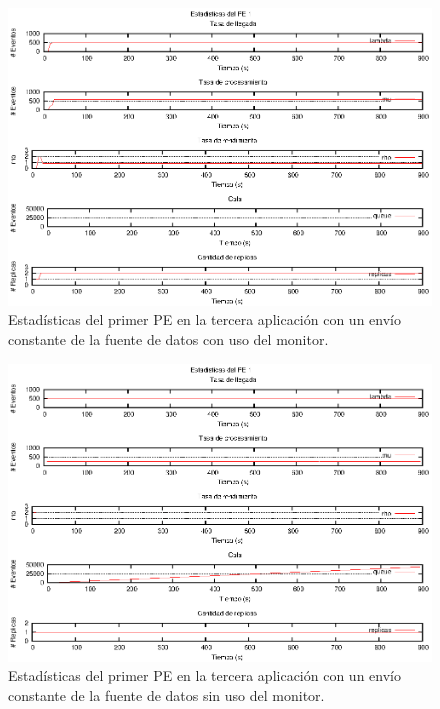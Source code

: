 \begin{figure}[!hptb]
\centering
    \includegraphics[scale=1.1]{images/exp/app3/cm/logical/statusOnePE.eps}
    \caption{Estadísticas del primer PE en la tercera aplicación con un envío constante de la fuente de datos con uso del monitor.}
    \label{fig:app3-statusOnePE-cm}
\end{figure}

\begin{figure}[!hptb]
\centering
    \includegraphics[scale=1.1]{images/exp/app3/sm/logical/statusOnePE.eps}
    \caption{Estadísticas del primer PE en la tercera aplicación con un envío constante de la fuente de datos sin uso del monitor.}
    \label{fig:app3-statusOnePE-sm}
\end{figure}


